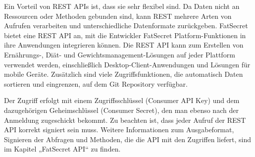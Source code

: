 Ein Vorteil von REST APIs ist, dass sie sehr flexibel sind. Da Daten nicht an Ressourcen oder Methoden gebunden sind, kann REST mehrere Arten von Aufrufen verarbeiten und unterschiedliche Datenformate zurückgeben. 
FatSecret bietet eine REST API an, mit die Entwickler FatSecret Platform-Funktionen in ihre Anwendungen integrieren können. Die REST API kann zum Erstellen von Ernährungs-, Diät- und Gewichtsmanagement-Lösungen auf jeder Plattform verwendet werden, einschließlich Desktop-Client-Anwendungen und Lösungen für mobile Geräte. Zusätzlich sind viele Zugriffsfunktionen, die automatisch Daten sortieren und eingrenzen, auf dem Git Repository verfügbar. 

Der Zugriff erfolgt mit einem Zugriffsschlüssel (Consumer API Key)  und dem dazugehörigen Geheimschlüssel (Consumer Secret), den man ebenso nach der Anmeldung zugeschickt bekommt. Zu beachten ist, dass jeder Aufruf der REST API korrekt signiert sein muss. Weitere Informationen zum Ausgabeformat, Signieren der Abfragen und Methoden, die die API mit den Zugriffen liefert, sind im Kapitel „FatSecret API“ zu finden.
